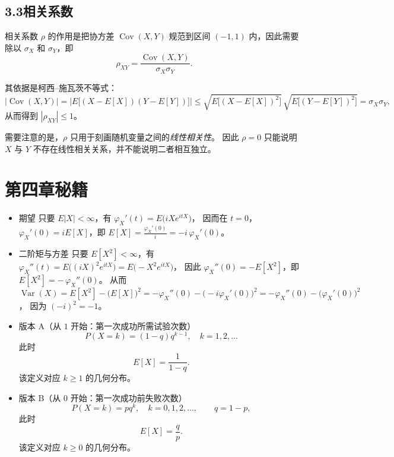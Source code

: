 \section*{3.3相关系数}
\begin{note}
相关系数 $\rho$ 的作用是把协方差 $\operatorname{Cov}(X,Y)$ 规范到区间 $(-1,1)$ 内，因此需要除以
$\sigma_X$ 和 $\sigma_Y$，即
\[
\rho_{XY}=\frac{\operatorname{Cov}(X,Y)}{\sigma_X\sigma_Y}.
\]

其依据是柯西--施瓦茨不等式：
\[
\bigl|\operatorname{Cov}(X,Y)\bigr|
=\bigl|E\!\big[(X-E[X])(Y-E[Y])\big]\bigr|
\le \sqrt{E\!\big[(X-E[X])^2\big]}\,
      \sqrt{E\!\big[(Y-E[Y])^2\big]}
=\sigma_X\sigma_Y,
\]
从而得到 $|\rho_{XY}|\le 1$。

需要注意的是，$\rho$ 只用于刻画随机变量之间的\emph{线性相关性}。
因此 $\rho=0$ 只能说明 $X$ 与 $Y$ 不存在线性相关关系，并不能说明二者相互独立。
\end{note}
\chapter{第四章秘籍}
\begin{itemize}
  \item 期望  
  只要 $E|X|<\infty$，有
  $\varphi_X'(t)=E\!\big(iX e^{itX}\big)$，
  因而在 $t=0$，
  $\varphi_X'(0)=iE[X]$，即
  $E[X]=\frac{\varphi_X'(0)}{i}=-i\,\varphi_X'(0)$。

  \item 二阶矩与方差  
  只要 $E[X^2]<\infty$，有
  $\varphi_X''(t)=E\!\big((iX)^2 e^{itX}\big)
  =E\!\big(-X^2 e^{itX}\big)$，
  因此
  $\varphi_X''(0)=-E[X^2]$，即
  $E[X^2]=-\,\varphi_X''(0)$。
  从而
  $\operatorname{Var}(X)
  =E[X^2]-\big(E[X]\big)^2
  =-\varphi_X''(0)-\big(-i\varphi_X'(0)\big)^2
  =-\varphi_X''(0)-\big(\varphi_X'(0)\big)^2$，
  因为 $(-i)^2=-1$。
\end{itemize}
\begin{itemize}
  \item 版本 A（从 $1$ 开始：第一次成功所需试验次数）
  \[
  P(X=k)=(1-q)q^{k-1},\quad k=1,2,\dots
  \]
  此时
  \[
  E[X]=\frac{1}{1-q}.
  \]
  该定义对应 $k\ge 1$ 的几何分布。

  \item 版本 B（从 $0$ 开始：第一次成功前失败次数）
  \[
  P(X=k)=p q^{k},\quad k=0,1,2,\dots,\qquad q=1-p,
  \]
  此时
  \[
  E[X]=\frac{q}{p}.
  \]
  该定义对应 $k\ge 0$ 的几何分布。
\end{itemize}
